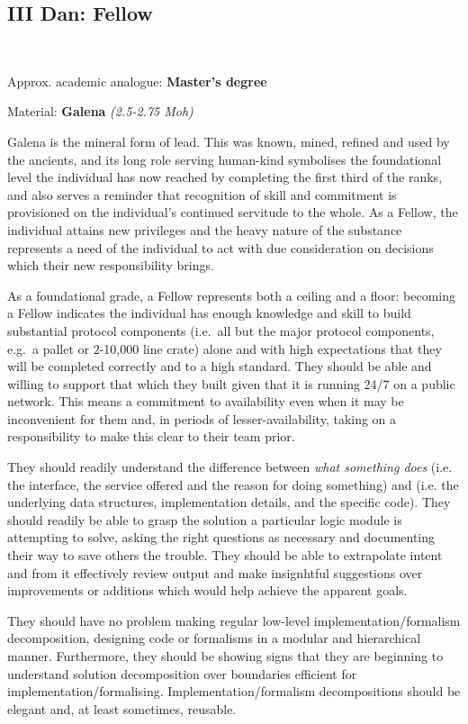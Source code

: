 \documentclass[9pt,oneside]{amsart}
\begin{document}
\subsection{III Dan: Fellow}\label{iii-dan-fellow}~\\


Approx. academic analogue: \textbf{Master's degree}

Material: \textbf{Galena} \emph{(2.5-2.75 Moh)}

Galena is the mineral form of lead. This was known, mined, refined and used by the ancients, and its long role serving human-kind symbolises the foundational level the individual has now reached by completing the first third of the ranks, and also serves a reminder that recognition of skill and commitment is provisioned on the individual's continued servitude to the whole. As a Fellow, the individual attains new privileges and the heavy nature of the substance represents a need of the individual to act with due consideration on decisions which their new responsibility brings.

As a foundational grade, a Fellow represents both a ceiling and a floor: becoming a Fellow indicates the individual has enough knowledge and skill to build substantial protocol components (i.e.~all but the major protocol components, e.g.~a pallet or 2-10,000 line crate) alone and with high expectations that they will be completed correctly and to a high standard. They should be able and willing to support that which they built given that it is running 24/7 on a public network. This means a commitment to availability even when it may be inconvenient for them and, in periods of lesser-availability, taking on a responsibility to make this clear to their team prior.

They should readily understand the difference between \textit{what something does} (i.e. the interface, the service offered and the reason for doing something) and  (i.e. the underlying data structures, implementation details, and the specific code). They should readily be able to grasp the solution a particular logic module is attempting to solve, asking the right questions as necessary and documenting their way to save others the trouble. They should be able to extrapolate intent and from it effectively review output and make insignhtful suggestions over improvements or additions which would help achieve the apparent goals.

They should have no problem making regular low-level implementation/formalism decomposition, designing code or formalisms in a modular and hierarchical manner. Furthermore, they should be showing signs that they are beginning to understand solution decomposition over boundaries efficient for implementation/formalising. Implementation/formalism decompositions should be elegant and, at least sometimes, reusable.
\end{document}
